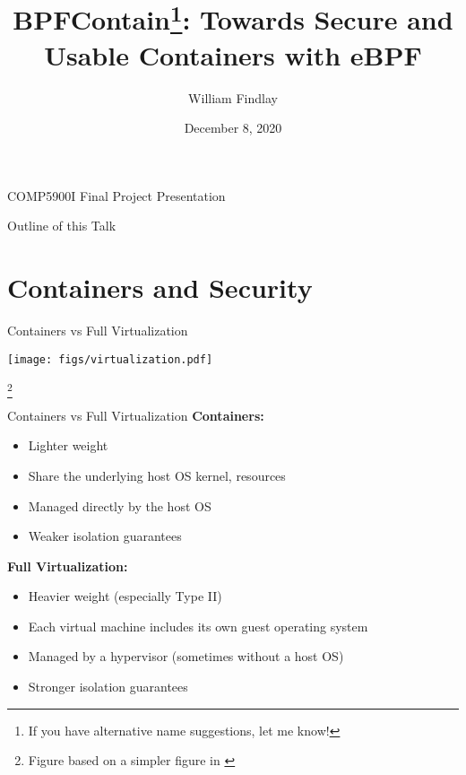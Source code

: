 \documentclass[12pt, dvipsnames, aspectratio=169]{beamer}
\date{December 8, 2020}
\title{BPFContain\footnote{If you have alternative name suggestions, let me know!}: Towards Secure and Usable Containers with eBPF}
\author{William Findlay}
\institute{Carleton University\\\href{mailto:will@ccsl.carleton.ca}{\ttfamily will@ccsl.carleton.ca}}
\newcommand\ufootnote[1]{%
    \begingroup
        \renewcommand\thefootnote{}\footnote{\hspace{-1.8em}#1}%
        \addtocounter{footnote}{-1}%
    \endgroup
}
\begin{document}
\setwatermark[hoffset=6cm, voffset=0.3cm]{}

\begin{frame}
\titlepage
\begin{center}
\footnotesize COMP5900I Final Project Presentation
\end{center}
\end{frame}

\begin{frame}{Outline of this Talk}
    \tableofcontents
\end{frame}

\section{Containers and Security}

\begin{frame}[c]{Containers vs Full Virtualization}
\begin{center}
  \color{black}
  \texttt{[image: figs/virtualization.pdf]}
\end{center}
\ufootnote{Figure based on a simpler figure in \cite{sultan2019_container_security}}
\end{frame}

\begin{frame}[c]{Containers vs Full Virtualization}
\textbf{Containers:}
\begin{itemize}
  \item Lighter weight
  \item Share the underlying host OS kernel, resources
  \item Managed directly by the host OS
  \item Weaker isolation guarantees
\end{itemize}
\vfill
\textbf{Full Virtualization:}
\begin{itemize}
  \item Heavier weight (especially Type II)
  \item Each virtual machine includes its own guest operating system
  \item Managed by a hypervisor (sometimes without a host OS)
  \item Stronger isolation guarantees
\end{itemize}
\end{frame}
\end{document}
